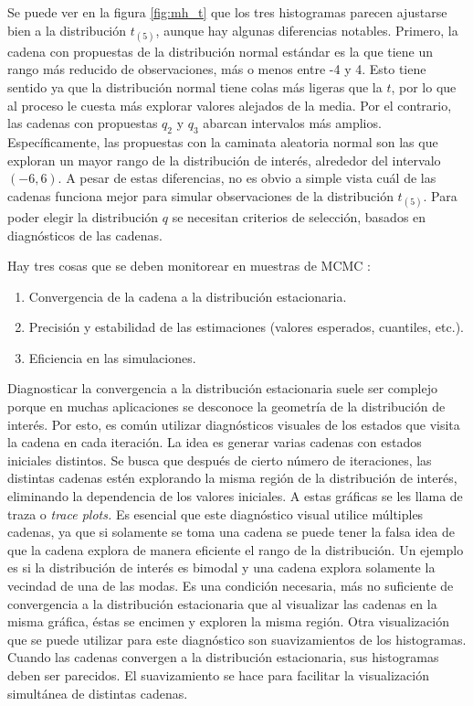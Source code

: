 \documentclass[11pt,a4paper]{article}
\begin{document}
\newpage

Se puede ver en la figura \ref{fig:mh_t} que los tres histogramas parecen ajustarse bien a la distribución $t_{(5)}$, aunque hay algunas diferencias notables. Primero, la cadena con propuestas de la distribución normal estándar es la que tiene un rango más reducido de observaciones, más o menos entre -4 y 4. Esto tiene sentido ya que la distribución normal tiene colas más ligeras que la $t$, por lo que al proceso le cuesta más explorar valores alejados de la media. Por el contrario, las cadenas con propuestas $q_2$ y $q_3$ abarcan intervalos más amplios. Específicamente, las propuestas con la caminata aleatoria normal son las que exploran un mayor rango de la distribución de interés, alrededor del intervalo $(-6, 6)$. A pesar de estas diferencias, no es obvio a simple vista cuál de las cadenas funciona mejor para simular observaciones de la distribución $t_{(5)}$. Para poder elegir la distribución $q$ se necesitan criterios de selección, basados en diagnósticos de las cadenas.

Hay tres cosas que se deben monitorear en muestras de MCMC \citep{kruschke}:
\begin{enumerate}
\item Convergencia de la cadena a la distribución estacionaria.
\item Precisión y estabilidad de las estimaciones (valores esperados, cuantiles, etc.).
\item Eficiencia en las simulaciones.
\end{enumerate}

Diagnosticar la convergencia a la distribución estacionaria suele ser complejo porque en muchas aplicaciones se desconoce la geometría de la distribución de interés. Por esto, es común utilizar diagnósticos visuales de los estados que visita la cadena en cada iteración. La idea es generar varias cadenas con estados iniciales distintos. Se busca que después de cierto número de iteraciones, las distintas cadenas estén explorando la misma región de la distribución de interés, eliminando la dependencia de los valores iniciales. A estas gráficas se les llama de traza o \textit{trace plots.} Es esencial que este diagnóstico visual utilice múltiples cadenas, ya que si solamente se toma una cadena se puede tener la falsa idea de que la cadena explora de manera eficiente el rango de la distribución. Un ejemplo es si la distribución de interés es bimodal y una cadena explora solamente la vecindad de una de las modas. Es una condición necesaria, más no suficiente de convergencia a la distribución estacionaria que al visualizar las cadenas en la misma gráfica, éstas se encimen y exploren la misma región. Otra visualización que se puede utilizar para este diagnóstico son suavizamientos de los histogramas. Cuando las cadenas convergen a la distribución estacionaria, sus histogramas deben ser parecidos. El suavizamiento se hace para facilitar la visualización simultánea de distintas cadenas.
\end{document}
